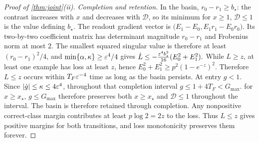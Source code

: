 \begin{proof}[Proof of \cref{thm:joint}(ii)]
\emph{Completion and retention.}
In the basin, $r_0-r_1\ge b_\star$: the contrast increases with $x$ and decreases with $\mathcal D$, so its minimum for $x\ge1$, $\mathcal D\le1$
is the value defining $b_\star$. The readout gradient vector is
$\bigl(E_1-E_0,E_1r_1-E_0r_0\bigr)$.
Its two-by-two coefficient matrix has determinant magnitude $r_0-r_1$ and Frobenius norm at most $2$.
The smallest squared singular value is therefore at least $(r_0-r_1)^2/4$, and
$\min\{\alpha,\kappa\}\ge\varepsilon^4/4$ gives
 $\dot L\le-\frac{\varepsilon^4b_\star^2}{16}(E_0^2+E_1^2).$ 
While $L\ge z$, at least one example has loss at least $z$, hence
$E_0^2+E_1^2\ge p^2(1-e^{-z})^2$. Therefore $L\le z$ occurs within $T_F\varepsilon^{-4}$ time as long as the basin persists.
At entry $g<1$. Since $|\dot g|\le\kappa\le4\varepsilon^4$, throughout that completion interval
$g\le1+4T_F<G_{\max}$.  for $x\ge x_\star$, $g\le G_{\max}$ therefore preserves both $x\ge x_\star$ and $\mathcal D\le1$ throughout the interval.
The basin is therefore retained through completion.
Any nonpositive correct-class margin contributes at least $p\log2=2z$ to the loss. Thus $L\le z$ gives positive margins for both transitions, and loss monotonicity preserves them forever.
\end{proof}


